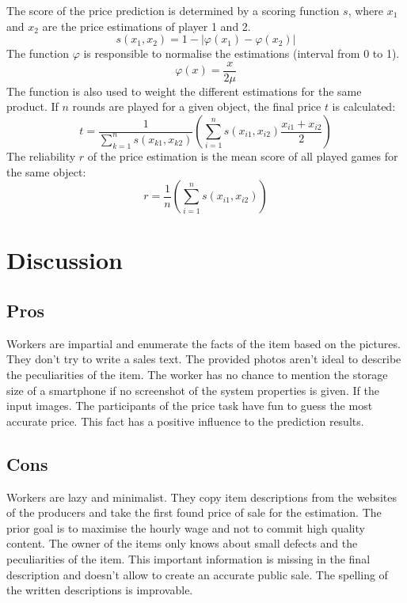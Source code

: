 The score of the price prediction is determined by a scoring function \( s \), where \( x_1 \) and \( x_2 \) are the price estimations of player 1 and 2.
\begin{equation}
s(x_1,x_2) = 1 - |\varphi(x_1) - \varphi(x_2)|
\end{equation}
The function \( \varphi \) is responsible to normalise the estimations (interval from 0 to 1).
\begin{equation}
\varphi(x) = \frac{x}{2\mu}
\end{equation}
The function is also used to weight the different estimations for the same product. If \( n \) rounds are played for a given object, the final price \( t \) is calculated:
\begin{equation}
t = \frac{1}{\sum_{k=1}^{n} s(x_{k1},x_{k2})}\left(\sum_{i=1}^{n} s(x_{i1},x_{i2})\frac{x_{i1}+x_{i2}}{2}\right)
\end{equation}
The reliability \( r \) of the price estimation is the mean score of all played games for the same object:
\begin{equation}
r = \frac{1}{n}\left(\sum_{i=1}^{n} s(x_{i1},x_{i2})\right)
\end{equation}

\section{Discussion}
\subsection{Pros}
Workers are impartial and enumerate the facts of the item based on the pictures. They don't try to write a sales text. The provided photos aren't ideal to describe the peculiarities of the item. The worker has no chance to mention the storage size of a smartphone if no screenshot of the system properties is given. If the input images. The participants of the price task have fun to guess the most accurate price. This fact has a positive influence to the prediction results. 
\subsection{Cons}
Workers are lazy and minimalist. They copy item descriptions from the websites of the producers and take the first found price of sale for the estimation. The prior goal is to maximise the hourly wage and not to commit high quality content. The owner of the items only knows about small defects and the peculiarities of the item. This important information is missing in the final description and doesn't allow to create an accurate public sale. The spelling of the written descriptions is improvable.
